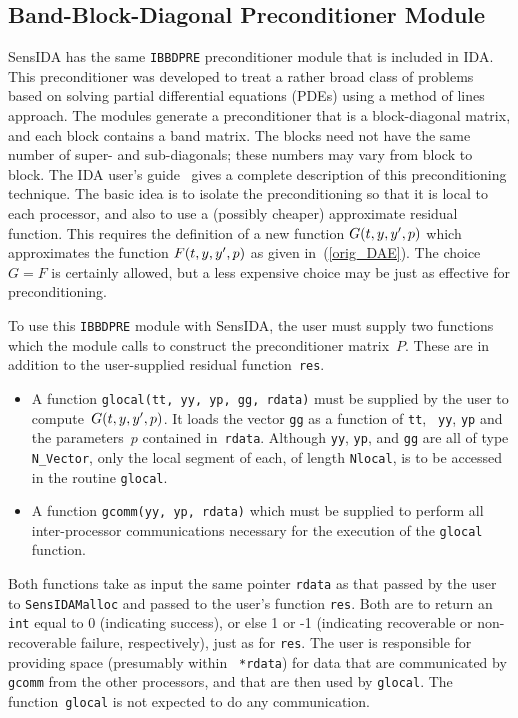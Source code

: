 \subsection{Band-Block-Diagonal Preconditioner Module}
SensIDA has the same {\tt IBBDPRE} preconditioner module that is
included in IDA.
This preconditioner was developed to treat a rather broad class of
problems based on solving partial differential equations (PDEs) using
a method of lines approach.
The modules generate a preconditioner that is a block-diagonal
matrix, and each block contains a band matrix.
The blocks need not have the same number of super- and sub-diagonals;
these numbers may vary from block to block.
The IDA user's guide~\cite{IDA_UG} gives a complete description of
this preconditioning technique.
The basic idea is to isolate the preconditioning so that it is local
to each processor, and also to use a (possibly cheaper) approximate
residual function.
This requires the definition of a new function $G(t,y,y^{\prime},p)$
which approximates the function $F(t,y,y^{\prime},p)$ as given
in~(\ref{orig_DAE}). 
The choice $G=F$ is certainly allowed, but a less expensive choice may
be just as effective for preconditioning.

To use this {\tt IBBDPRE} module with SensIDA, the user must supply two
functions which the module calls to construct the preconditioner matrix~$P$.
These are in addition to the user-supplied residual function~{\tt res}.
\begin{itemize}
\item A function {\tt glocal(tt, yy, yp, gg, rdata)} must
be supplied by the user to compute~$G(t,y,y^{\prime},p)$.
It loads the vector {\tt gg} as a function of {\tt tt}, {\tt
yy}, {\tt yp} and the parameters~$p$ contained in~{\tt rdata}.
Although {\tt yy}, {\tt yp}, and {\tt gg} are all of type {\tt
N\_Vector}, only the local segment of each, of length {\tt Nlocal}, is
to be accessed in the routine {\tt glocal}.
\item A function {\tt gcomm(yy, yp, rdata)} which must be
supplied to perform all inter-processor communications necessary for
the execution of the {\tt glocal} function.
\end{itemize}

Both functions take as input the same pointer {\tt rdata} as that
passed by the user to {\tt SensIDAMalloc} and passed to the user's
function {\tt res}.
Both are to return an {\tt int} equal to 0 (indicating success), or
else 1 or -1 (indicating recoverable or non-recoverable failure,
respectively), just as for {\tt res}.
The user is responsible for providing space (presumably within {\tt
*rdata}) for data that are communicated by {\tt gcomm} from the other
processors, and that are then used by {\tt glocal}.
The function~{\tt glocal} is not expected to do any communication.

